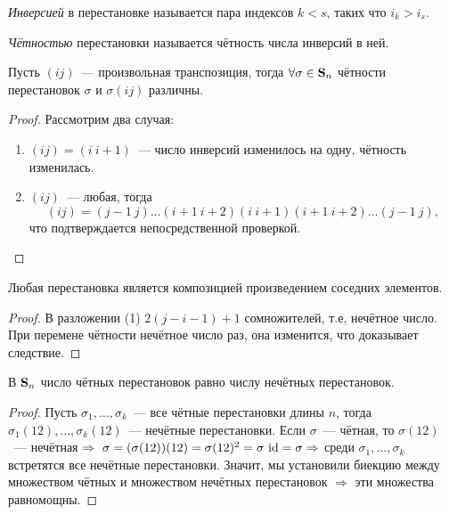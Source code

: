         \begin{definition}
        \textit{Инверсией} в перестановке называется пара индексов $k < s$, таких что $i_k > i_s$.
        \end{definition}
        \begin{definition}
            \textit{Чётностью} перестановки называется чётность числа инверсий в ней.
        \end{definition}
        \begin{lemma}
            Пусть $(ij)$~--- произвольная транспозиция, тогда ${\forall \sigma \in \mathbf{S}_n}$ чётности перестановок $\sigma$ и $\sigma (ij)$ различны.
        \end{lemma}
        \begin{proof}
            Рассмотрим два случая:
            \begin{enumerate}
                \setlength\itemsep{0.1em}
                \item $(ij) = (i \ i+1)$~--- число инверсий изменилось на одну, чётность изменилась.
                \item $(ij)$~--- любая, тогда
                \begin{equation}
                    (ij) = (j-1 \ j)\ldots(i+1 \ i+2)(i \ i+1)(i+1 \ i+2)\ldots(j-1 \ j),
                \end{equation}
                что подтверждается непосредственной проверкой. \qedhere
            \end{enumerate}
        \end{proof}
        \begin{consequence*}
            Любая перестановка является композицией произведением соседних элементов.
        \end{consequence*}
        \begin{proof}
            В разложении (1) $2(j - i - 1) + 1$ сомножителей, т.е, нечётное число. При перемене чётности нечётное число раз, она изменится, что доказывает следствие.
        \end{proof}
        \begin{theorem}
            В $\mathbf{S}_n$ число чётных перестановок равно числу нечётных перестановок.
        \end{theorem}
        \begin{proof}
            Пусть $\sigma_1,\ldots,\sigma_k$~--- все чётные перестановки длины $n$, тогда $\sigma_1(12),\ldots,\sigma_k(12)$~--- нечётные перестановки. Если $\sigma$~--- чётная, то $\sigma (12)$~--- нечётная $\Rightarrow \ {\sigma = (\sigma (12))(12) = \sigma (12)^2 = \sigma \ \mathrm{id} = \sigma} \Rightarrow$ среди $\sigma_1,\ldots,\sigma_k$ встретятся все нечётные перестановки. Значит, мы установили биекцию между множеством чётных и множеством нечётных перестановок $\Rightarrow$ эти множества равномощны.
        \end{proof}

